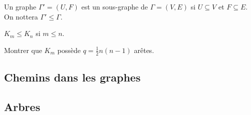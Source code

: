 \begin{defn}
Un graphe ${\Gamma}'=(U,F)$ est un sous-graphe de $\Gamma=(V,E)$ si $ U \subseteq V$ et $F \subseteq E$. On nottera $ {\Gamma}' \leq \Gamma$.
\end{defn}

\begin{exmp}
$ K_{m} \leq K_{n}$ si $ m \leq n$.
\end{exmp}

\begin{exo}
Montrer que $K_{m}$ possède $ q=\frac{1}{2}n(n-1)$ arêtes.
\end{exo}

\subsection{Chemins dans les graphes}

\begin{defn}

\end{defn}

\begin{defn}

\end{defn}

\begin{defn}

\end{defn}

\subsection{Arbres}

\begin{defn}

\end{defn}

\begin{defn}

\end{defn}

\begin{exmp}

\end{exmp}

\begin{prop}

\end{prop}

\begin{demo}

\end{demo}

\begin{thrm}

\end{thrm}

\begin{demo}

\end{demo}
